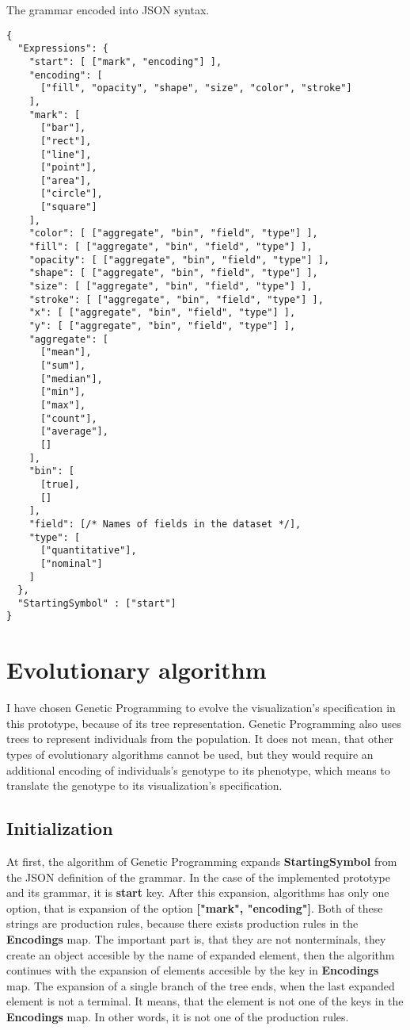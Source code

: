 \begin{listing}[htbp]
\caption{\label{code:grammar-json-syntax}The grammar encoded into JSON syntax.}
\begin{verbatim}
{
  "Expressions": {
    "start": [ ["mark", "encoding"] ],
    "encoding": [
      ["fill", "opacity", "shape", "size", "color", "stroke"]
    ],
    "mark": [
      ["bar"],
      ["rect"],
      ["line"],
      ["point"],
      ["area"],
      ["circle"],
      ["square"]
    ],
    "color": [ ["aggregate", "bin", "field", "type"] ],
    "fill": [ ["aggregate", "bin", "field", "type"] ],
    "opacity": [ ["aggregate", "bin", "field", "type"] ],
    "shape": [ ["aggregate", "bin", "field", "type"] ],
    "size": [ ["aggregate", "bin", "field", "type"] ],
    "stroke": [ ["aggregate", "bin", "field", "type"] ],
    "x": [ ["aggregate", "bin", "field", "type"] ],
    "y": [ ["aggregate", "bin", "field", "type"] ],
    "aggregate": [
      ["mean"],
      ["sum"],
      ["median"],
      ["min"],
      ["max"],
      ["count"],
      ["average"],
      []
    ],
    "bin": [
      [true],
      []
    ],
    "field": [/* Names of fields in the dataset */],
    "type": [
      ["quantitative"],
      ["nominal"]
    ]
  },
  "StartingSymbol" : ["start"]
}
\end{verbatim}
\end{listing}

\clearpage

\section{Evolutionary algorithm}
I have chosen Genetic Programming to evolve the visualization's specification in this prototype, because of its tree representation. Genetic Programming also uses trees to represent individuals from the population. It does not mean, that other types of evolutionary algorithms cannot be used, but they would require an additional encoding of individuals's genotype to its phenotype, which means to translate the genotype to its visualization's specification.
  \subsection{Initialization}
  At first, the algorithm of Genetic Programming expands \textbf{StartingSymbol} from the JSON definition of the grammar. In the case of the implemented prototype and its grammar, it is \textbf{start} key. After this expansion, algorithms has only one option, that is expansion of the option \textbf{["mark", "encoding"]}. Both of these strings are production rules, because there exists production rules in the \textbf{Encodings} map. The important part is, that they are not nonterminals, they create an object accesible by the name of expanded element, then the algorithm continues with the expansion of elements accesible by the key in \textbf{Encodings} map. The expansion of a single branch of the tree ends, when the last expanded element is not a terminal. It means, that the element is not one of the keys in the \textbf{Encodings} map. In other words, it is not one of the production rules.

